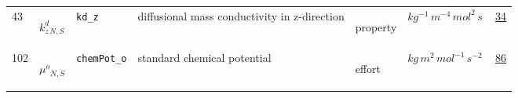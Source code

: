 \begin{longtable}{|p{1cm}|p{2.5cm}|p{4.5cm}|p{8cm}|p{3.0cm}|p{3cm}|p{1cm}|}
                 \\
            43
             & \hypertarget{"v:43"}{ $ {{k^d_z}}{_{N, S}} $}
             & \verb|kd_z|
             & diffusional mass conductivity in z-direction
             & \begin{lay}property \end{lay}
             & $ kg^{-1} \,m^{-4} \,mol^{2} \,s \, $
             &                 \hyperlink{"e:34"}{ 34 }
                 \\
            102
             & \hypertarget{"v:102"}{ $ {{\mu^o}}{_{N, S}} $}
             & \verb|chemPot_o|
             & standard chemical potential
             & \begin{lay}effort \end{lay}
             & $ kg \,m^{2} \,mol^{-1} \,s^{-2} \, $
             &                 \hyperlink{"e:86"}{ 86 }
                 \\
    \end{longtable}